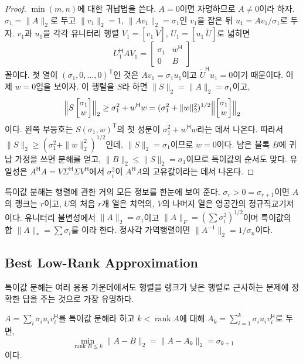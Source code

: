 \begin{proof}
$\min(m,n)$에 대한 귀납법을 쓴다. $A=0$이면 자명하므로 $A\ne0$이라 하자. $\sigma_1=\|A\|_2$로 두고 $\|v_1\|_2=1$, $\|Av_1\|_2=\sigma_1$인 $v_1$을 잡은 뒤 $u_1=Av_1/\sigma_1$로 두자. $v_1$과 $u_1$을 각각 유니터리 행렬 $V_1=[v_1\ \widetilde V]$, $U_1=[u_1\ \widetilde U]$로 넓히면
\[
U_1^{\mathsf H}AV_1=\begin{bmatrix}\sigma_1&w^{\mathsf H}\\0&B\end{bmatrix}
\]
꼴이다. 첫 열이 $(\sigma_1,0,\dots,0)^{\mathsf T}$인 것은 $Av_1=\sigma_1u_1$이고 $\widetilde U^{\mathsf H}u_1=0$이기 때문이다. 이제 $w=0$임을 보이자. 이 행렬을 $S$라 하면 $\|S\|_2=\|A\|_2=\sigma_1$이고,
\[
\Bigl\|S\begin{bmatrix}\sigma_1\\w\end{bmatrix}\Bigr\|_2\ge\sigma_1^2+w^{\mathsf H}w=(\sigma_1^2+\|w\|_2^2)^{1/2}\Bigl\|\begin{bmatrix}\sigma_1\\w\end{bmatrix}\Bigr\|_2
\]
이다. 왼쪽 부등호는 $S(\sigma_1,w)^{\mathsf T}$의 첫 성분이 $\sigma_1^2+w^{\mathsf H}w$라는 데서 나온다. 따라서 $\|S\|_2\ge(\sigma_1^2+\|w\|_2^2)^{1/2}$인데, $\|S\|_2=\sigma_1$이므로 $w=0$이다. 남은 블록 $B$에 귀납 가정을 쓰면 분해를 얻고, $\|B\|_2\le\|S\|_2=\sigma_1$이므로 특이값의 순서도 맞다. 유일성은 $A^{\mathsf H}A=V\Sigma^{\mathsf H}\Sigma V^{\mathsf H}$에서 $\sigma_i^2$이 $A^{\mathsf H}A$의 고유값이라는 데서 나온다.
\end{proof}

특이값 분해는 행렬에 관한 거의 모든 정보를 한눈에 보여 준다. $\sigma_r>0=\sigma_{r+1}$이면 $A$의 랭크는 $r$이고, $U$의 처음 $r$개 열은 치역의, $V$의 나머지 열은 영공간의 정규직교기저이다. 유니터리 불변성에서 $\|A\|_2=\sigma_1$이고 $\|A\|_F=(\sum\sigma_i^2)^{1/2}$이며 특이값의 합 $\|A\|_*=\sum\sigma_i$를 이라 한다. 정사각 가역행렬이면 $\|A^{-1}\|_2=1/\sigma_n$이다.

\subsection{Best Low-Rank Approximation}

특이값 분해는 여러 응용 가운데에서도 행렬을 랭크가 낮은 행렬로 근사하는 문제에 정확한 답을 주는 것으로 가장 유명하다.

\begin{theorem}
\label{thm:eckart-young}
$A=\sum_{i}\sigma_iu_iv_i^{\mathsf H}$를 특이값 분해라 하고 $k<\operatorname{rank}A$에 대해 $A_k=\sum_{i=1}^k\sigma_iu_iv_i^{\mathsf H}$로 두면,
\[
\min_{\operatorname{rank}B\le k}\|A-B\|_2=\|A-A_k\|_2=\sigma_{k+1}
\]
이다.
\end{theorem}

